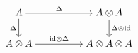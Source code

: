 $$\begin{tikzcd}[ampersand replacement=\&,cramped]
	A \&\& {A\otimes A} \\
	{A\otimes A} \&\& {A\otimes A\otimes A}
	\arrow["\Delta", from=1-1, to=1-3]
	\arrow["\Delta"', from=1-1, to=2-1]
	\arrow["{\Delta\otimes \mathrm{id}}", from=1-3, to=2-3]
	\arrow["{\mathrm{id}\otimes \Delta}", from=2-1, to=2-3]
\end{tikzcd}$$
